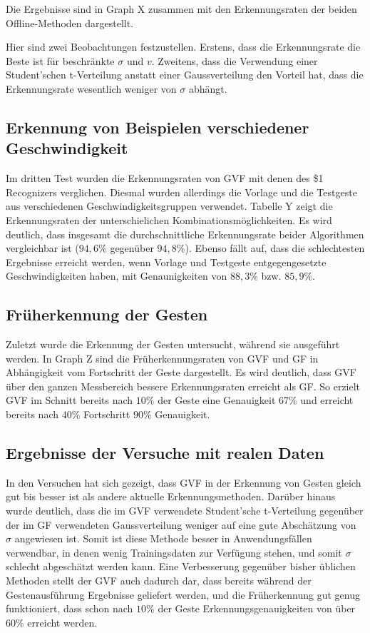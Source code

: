 \documentclass{llncs}
\begin{document}
Die Ergebnisse sind in Graph X zusammen mit den Erkennungsraten der beiden Offline-Methoden dargestellt.

Hier sind zwei Beobachtungen festzustellen. Erstens, dass die Erkennungsrate die Beste ist für beschränkte $\sigma$ und $v$. Zweitens, dass die Verwendung einer Student'schen t-Verteilung anstatt einer Gaussverteilung den Vorteil hat, dass die Erkennungsrate wesentlich weniger von $\sigma$ abhängt.

\subsection{Erkennung von Beispielen verschiedener Geschwindigkeit}
Im dritten Test wurden die Erkennungsraten von GVF mit denen des \$1 Recognizers verglichen. Diesmal wurden allerdings die Vorlage und die Testgeste aus verschiedenen Geschwindigkeitsgruppen verwendet. Tabelle Y zeigt die Erkennungsraten der unterschielichen Kombinationsmöglichkeiten. Es wird deutlich, dass insgesamt die durchschnittliche Erkennungsrate beider Algorithmen vergleichbar ist ($94,6\%$ gegenüber $94,8\%$). Ebenso fällt auf, dass die schlechtesten Ergebnisse erreicht werden, wenn Vorlage und Testgeste  entgegengesetzte Geschwindigkeiten haben, mit Genaunigkeiten von $88,3\%$ bzw. $85,9\%$.

\subsection{Früherkennung der Gesten}
Zuletzt wurde die Erkennung der Gesten untersucht, während sie ausgeführt werden. In Graph Z sind die Früherkennungsraten von GVF und GF in Abhängigkeit vom Fortschritt der Geste dargestellt. Es wird deutlich, dass GVF über den ganzen Messbereich bessere Erkennungsraten erreicht als GF. So erzielt GVF im Schnitt bereits nach $10\%$ der Geste eine Genauigkeit $67\%$ und erreicht bereits nach $40\%$ Fortschritt $90\%$ Genauigkeit.

\subsection{Ergebnisse der Versuche mit realen Daten}
In den Versuchen hat sich gezeigt, dass GVF in der Erkennung von Gesten gleich gut bis besser ist als andere aktuelle Erkennungsmethoden. Darüber hinaus wurde deutlich, dass die im GVF verwendete Student'sche t-Verteilung gegenüber der im GF verwendeten Gaussverteilung weniger auf eine gute Abschätzung von $\sigma$ angewiesen ist. Somit ist diese Methode besser in Anwendungsfällen verwendbar, in denen wenig Trainingsdaten zur Verfügung stehen, und somit $\sigma$ schlecht abgeschätzt werden kann. Eine Verbesserung gegenüber bisher üblichen Methoden stellt der GVF auch dadurch dar, dass bereits während der Gestenausführung Ergebnisse geliefert werden, und die Früherkennung gut genug funktioniert, dass schon nach $10\%$ der Geste Erkennungsgenauigkeiten von über $60\%$ erreicht werden.
\end{document}
